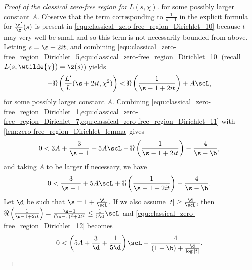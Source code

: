 \begin{proof}[Proof of the classical zero-free region for $L(s,\chi)$]
        for some possibly larger constant $A$. Observe that the term corresponding to $\frac{1}{s-1}$ in the explicit formula for $\frac{\z'}{\z}(s)$ is present in \cref{equ:classical_zero-free_region_Dirichlet_10} because $t$ may very well be small and so this term is not necessarily bounded from above. Letting $s = \s+2it$, and combining \cref{equ:classical_zero-free_region_Dirichlet_5,equ:classical_zero-free_region_Dirichlet_10} (recall $L(s,\wtilde{\chi}) = \z(s)$) yields
        \begin{equation}\label{equ:classical_zero-free_region_Dirichlet_11}
          -\Re\left(\frac{L'}{L}(\s+2it,\chi^{2})\right) < \Re\left(\frac{1}{\s-1+2it}\right)+A\scL,
        \end{equation}
        for some possibly larger constant $A$. Combining \cref{equ:classical_zero-free_region_Dirichlet_1,equ:classical_zero-free_region_Dirichlet_7,equ:classical_zero-free_region_Dirichlet_11} with \cref{lem:zero-free_region_Dirichlet_lemma} gives
        \[
          0 < 3A+\frac{3}{\s-1}+5A\scL+\Re\left(\frac{1}{\s-1+2it}\right)-\frac{4}{\s-\b},
        \]
        and taking $A$ to be larger if necessary, we have
        \begin{equation}\label{equ:classical_zero-free_region_Dirichlet_12}
          0 < \frac{3}{\s-1}+5A\scL+\Re\left(\frac{1}{\s-1+2it}\right)-\frac{4}{\s-\b}.
        \end{equation}
        Let $\d$ be such that $\s = 1+\frac{\d}{\scL}$. If we also assume $|t| \ge \frac{\d}{\scL}$, then $\Re\left(\frac{1}{\s-1+2it}\right) = \frac{\s-1}{(\s-1)^{2}+2t^{2}} \le \frac{1}{5\d}\scL$ and \cref{equ:classical_zero-free_region_Dirichlet_12} becomes
        \[
          0 < \left(5A+\frac{3}{\d}+\frac{1}{5\d}\right)\scL-\frac{4}{(1-\b)+\frac{\d}{\log|t|}}.
        \]

\end{proof}
